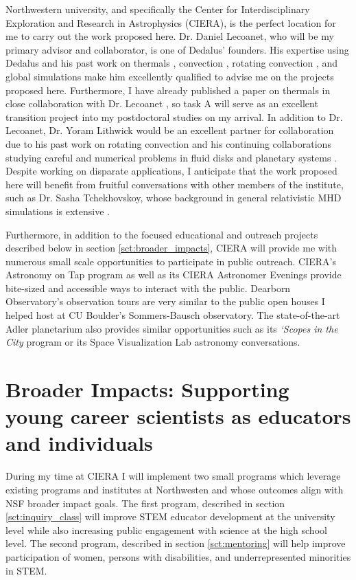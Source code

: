 \documentclass[aasms,11pt]{article}
\makeatletter
\renewcommand{\sectionmark}[1]{%
  \markboth{\ifnum \c@secnumdepth>\z@
      \thesection: \hskip 1em\relax
    \fi #1}{}}
\makeatother
\begin{document}
\label{sct:ciera}
Northwestern university, and specifically the Center for Interdisciplinary Exploration and Research in Astrophysics (CIERA), is the perfect location for me to carry out the work proposed here.
Dr. Daniel Lecoanet, who will be my primary advisor and collaborator, is one of Dedalus' founders.
His expertise using Dedalus and his past work on thermals \citep{lecoanet&jeevanjee2019, tarshis&all2018}, convection \citep{lecoanet&quataert2013, lecoanet&all2014, couston&all2017}, rotating convection \citep{couston&all2019}, and global simulations \citep{lecoanet&all2018} make him excellently qualified to advise me on the projects proposed here.
Furthermore, I have already published a paper on thermals in close collaboration with Dr. Lecoanet \citep{andersLB2019}, so task A will serve as an excellent transition project into my postdoctoral studies on my arrival.
In addition to Dr. Lecoanet, Dr. Yoram Lithwick would be an excellent partner for collaboration due to his past work on rotating convection \citep{BDLithwick2014} and his continuing collaborations studying careful and numerical problems in fluid disks \citep{LDLithwick2019} and planetary systems \citep{hadden&lithwick2018}.
Despite working on disparate applications, I anticipate that the work proposed here will benefit from fruitful conversations with other members of the institute, such as Dr. Sasha Tchekhovskoy, whose background in general relativistic MHD simulations is extensive \citep[as in e.g.,][]{tchekhovskoy&bromberg2016}.

Furthermore, in addition to the focused educational and outreach projects described below in section \ref{sct:broader_impacts}, CIERA will provide me with numerous small scale opportunities to participate in public outreach.
CIERA's Astronomy on Tap program as well as its CIERA Astronomer Evenings provide bite-sized and accessible ways to interact with the public.
Dearborn Observatory's observation tours are very similar to the public open houses I helped host at CU Boulder's Sommers-Bausch observatory.
The state-of-the-art Adler planetarium also provides similar opportunities such as its \emph{`Scopes in the City} program or its Space Visualization Lab astronomy conversations.


\section{Broader Impacts: Supporting young career scientists as educators and individuals}
\sectionmark{Broader Impacts}
\vspace{-6pt}
\label{sct:broader_impacts}
During my time at CIERA I will implement two small programs which leverage existing programs and institutes at Northwesten and whose outcomes align with NSF broader impact goals.
The first program, described in section \ref{sct:inquiry_class} will improve STEM educator development at the university level while also increasing public engagement with science at the high school level.
The second program, described in section \ref{sct:mentoring} will help improve participation of women, persons with disabilities, and underrepresented minorities in STEM.
\end{document}
